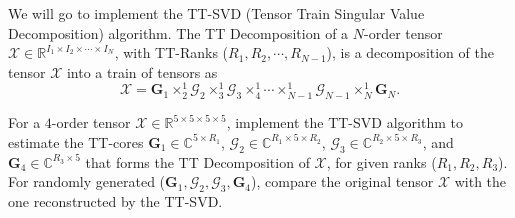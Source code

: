 \documentclass[a4paper,10pt]{article} %
\begin{document}
 \sloppy

\thetitle

\vskip-0.4cm
\begin{problem} \justifying
We will go to implement the TT-SVD (Tensor Train Singular Value Decomposition) algorithm. The TT Decomposition of a $N$-order tensor $\mathcal{X} \in \mathbb{R}^{I_1\times I_2 \times \cdots \times I_N}$, with TT-Ranks ($R_1, R_2, \cdots, R_{N-1}$), is a decomposition of the tensor $\mathcal{X}$ into a train of tensors as 
\begin{equation*}
    \mathcal{X} = \mathbf{G}_1 \times_2^1 \mathcal{G}_2 \times_3^1 \mathcal{G}_3  \times_4^1 \cdots \times_{N-1}^1 \mathcal{G}_{N-1} \times_{N}^1 \mathbf{G}_N.
\end{equation*}

\noindent For a $4$-order tensor $\mathcal{X} \in \mathbb{R}^{5\times 5\times 5\times 5}$, implement the TT-SVD algorithm to estimate the TT-cores $\mathbf{G}_1 \in \mathbb{C}^{5\times R_1}$, $\mathcal{G}_2 \in \mathbb{C}^{R_{1}\times 5\times R_2}$, $\mathcal{G}_3 \in \mathbb{C}^{R_{2}\times 5\times R_3}$, and $\mathbf{G}_4 \in \mathbb{C}^{R_3 \times 5}$ that forms the TT Decomposition of $\mathcal{X}$, for given ranks ($R_1,R_2,R_3$). For randomly generated ($\mathbf{G}_1, \mathcal{G}_2, \mathcal{G}_3, \mathbf{G}_4$), compare the original tensor $\mathcal{X}$ with the one reconstructed by the TT-SVD.

\end{problem}
\end{document}
